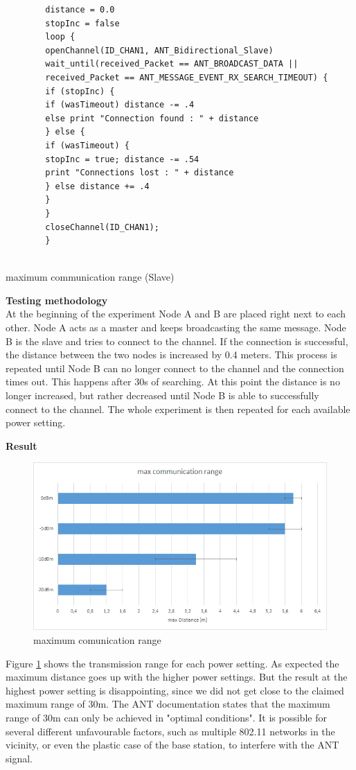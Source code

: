 \begin{description}
	\begin{code}[h]
		\begin{verbatim}
		distance = 0.0
		stopInc = false
		loop {
		openChannel(ID_CHAN1, ANT_Bidirectional_Slave)
		wait_until(received_Packet == ANT_BROADCAST_DATA || 
		received_Packet == ANT_MESSAGE_EVENT_RX_SEARCH_TIMEOUT) {
		if (stopInc) { 
		if (wasTimeout) distance -= .4
		else print "Connection found : " + distance
		} else {
		if (wasTimeout) { 
		stopInc = true; distance -= .54
		print "Connections lost : " + distance
		} else distance += .4
		}
		}
		closeChannel(ID_CHAN1);		
		}
		
		\end{verbatim}
		\caption{maximum communication range (Slave)}\label{lst:sExp6}
	\end{code}
	\item{\textbf{Testing methodology}} \hfill \\ At the beginning of the experiment Node A and B are placed right next to each other. Node A acts as a master and keeps broadcasting the same message. Node B is the slave and tries to connect to the channel. If the connection is successful, the distance between the two nodes is increased by 0.4 meters. This process is repeated until Node B can no longer connect to the channel and the connection times out. This happens after 30s of searching. At this point the distance is no longer increased, but rather decreased until Node B is able to successfully connect to the channel. The whole experiment is then repeated for each available power setting.	
	\item{\textbf{Result}} \hfill \\ 
	\begin{figure}[h]
		\centering
		\includegraphics[scale=0.5]{content/images/exp6.png}
		\caption{maximum comunication range}\label{fig:exp6}
	\end{figure}
	Figure \ref{fig:exp6} shows the transmission range for each power setting. As expected the maximum distance goes up with the higher power settings. But the result at the highest power setting is disappointing, since we did not get close to the claimed maximum range of 30m. The ANT documentation states that the maximum range of 30m can only be achieved in "optimal conditions"\cite{DynastreamInnovationsInc.2013}. It is possible for several different unfavourable factors, such as multiple 802.11 networks in the vicinity, or even the plastic case of the base station, to interfere with the ANT signal. 
\end{description}
\newpage